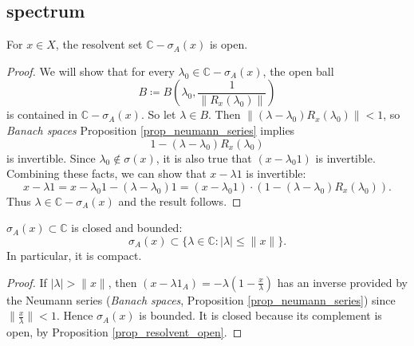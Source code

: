 \documentclass[12pt]{article}
\begin{document}

\subsection{spectrum} %

\begin{proposition}
\label{prop_resolvent_open}
	For $x\in X$, the resolvent set $\mathbb{C} - \sigma_A(x)$ is open.
\end{proposition}
\begin{proof}
	We will show that for every $\lambda_0\in\mathbb{C}-\sigma_A(x)$, the open ball
	\begin{equation*}
		B \coloneqq B(\lambda_0, \frac{1}{\|R_x(\lambda_0)\|})
	\end{equation*}
	is contained in $\mathbb{C}-\sigma_A(x)$. So let $\lambda\in B$. Then $\|(\lambda - \lambda_0)R_x(\lambda_0)\|<1$, so \textit{Banach spaces} Proposition \ref{prop_neumann_series} implies 
	\begin{equation*}
		1 - (\lambda - \lambda_0)R_x(\lambda_0)
	\end{equation*}
	is invertible. Since $\lambda_0\not\in \sigma(x)$, it is also true that $(x-\lambda_0 1)$ is invertible. Combining these facts, we can show that $x-\lambda 1$ is invertible:
	\begin{equation*}
		x-\lambda 1 = x - \lambda_0 1 - (\lambda - \lambda_0)1 = (x-\lambda_0 1)\cdot (1 - (\lambda - \lambda_0)R_x(\lambda_0)).
	\end{equation*}
	Thus $\lambda\in \mathbb{C}-\sigma_A(x)$ and the result follows.
\end{proof}

\begin{proposition}
\label{prop_spectrum_compact}
	$\sigma_A(x)\subset\mathbb{C}$ is closed and bounded:
	\begin{equation*}
		\sigma_A(x) \subset \{\lambda\in\mathbb{C} : |\lambda| \leq \|x\|\}.
	\end{equation*}
	In particular, it is compact.
\end{proposition}
\begin{proof}
	If $|\lambda|>\|x\|$, then $(x-\lambda 1_A) = -\lambda(1-\frac{x}{\lambda})$ has an inverse provided by the Neumann series (\textit{Banach spaces}, Proposition \ref{prop_neumann_series}) since $\|\frac{x}{\lambda}\|<1$. Hence $\sigma_A(x)$ is bounded. It is closed because its complement is open, by Proposition \ref{prop_resolvent_open}.
\end{proof}
\end{document}
